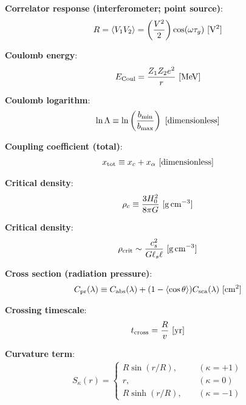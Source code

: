 \documentclass[a4paper,10pt]{article}
\begin{document}
{\noindent}\textbf{Correlator response (interferometer; point source)}:
\begin{align*}
    R = \langle V_1V_2 \rangle = \left(\frac{V^2}{2}\right)\cos(\omega\tau_g) ~ [{\rm V^2}]
\end{align*}

{\noindent}\textbf{Coulomb energy}:
\begin{align*}
    E_{\rm Coul} = \frac{Z_1Z_2e^2}{r} ~ [{\rm MeV}]
\end{align*}

{\noindent}\textbf{Coulomb logarithm}:
\begin{align*}
    \ln\Lambda \equiv \ln \left(\frac{b_{\rm min}}{b_{\rm max}}\right) ~ [{\rm dimensionless}]
\end{align*}

{\noindent}\textbf{Coupling coefficient (total)}:
\begin{align*}
    x_\mathrm{tot} \equiv x_c + x_\alpha ~ [{\rm dimensionless}]
\end{align*}

{\noindent}\textbf{Critical density}:
\begin{align*}
    \rho_c \equiv \dfrac{3H_0^2}{8\pi G}  ~ [{\rm g\,cm^{-3}}]
\end{align*}

{\noindent}\textbf{Critical density}:
\begin{align*}
    \rho_\mathrm{crit} \sim \frac{c_s^2}{G\ell_s\ell} ~ [{\rm g\,cm^{-3}}]
\end{align*}

{\noindent}\textbf{Cross section (radiation pressure)}:
\begin{align*}
   C_{\rm pr}(\lambda) \equiv C_{\rm abs}(\lambda) + (1-\langle\cos\theta\rangle)C_{\rm sca}(\lambda) ~ [{\rm cm^2}]
\end{align*}

{\noindent}\textbf{Crossing timescale}:
\begin{align*}
    t_\mathrm{cross} = \frac{R}{v} ~ [{\rm yr}]
\end{align*}

{\noindent}\textbf{Curvature term}:
\begin{align*}
S_\kappa(r) =
\left\{
\begin{aligned}
R\sin(r/R), ~~~~~& (\kappa = +1) \\
          r,~~~~~& (\kappa = 0) \\
R\sinh(r/R),~~~~~& (\kappa = -1)
\end{aligned}
\right.
\end{align*}
\end{document}
